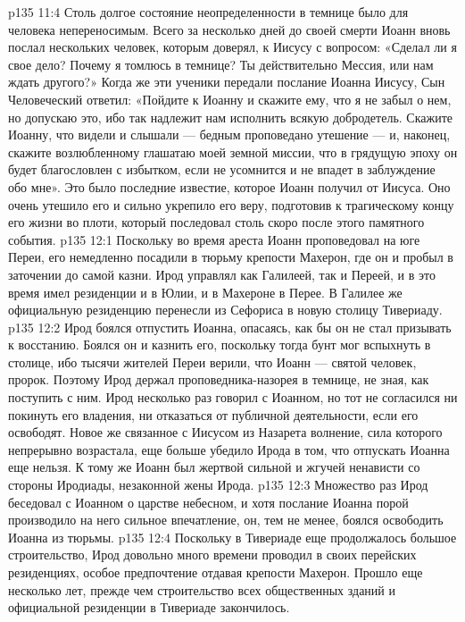 \vs p135 11:4 \pc Столь долгое состояние неопределенности в темнице было для человека непереносимым. Всего за несколько дней до своей смерти Иоанн вновь послал нескольких человек, которым доверял, к Иисусу с вопросом: «Сделал ли я свое дело? Почему я томлюсь в темнице? Ты действительно Мессия, или нам ждать другого?» Когда же эти ученики передали послание Иоанна Иисусу, Сын Человеческий ответил: «Пойдите к Иоанну и скажите ему, что я не забыл о нем, но допускаю это, ибо так надлежит нам исполнить всякую добродетель. Скажите Иоанну, что видели и слышали --- бедным проповедано утешение --- и, наконец, скажите возлюбленному глашатаю моей земной миссии, что в грядущую эпоху он будет благословлен с избытком, если не усомнится и не впадет в заблуждение обо мне». Это было последние известие, которое Иоанн получил от Иисуса. Оно очень утешило его и сильно укрепило его веру, подготовив к трагическому концу его жизни во плоти, который последовал столь скоро после этого памятного события.
\vs p135 12:1 Поскольку во время ареста Иоанн проповедовал на юге Переи, его немедленно посадили в тюрьму крепости Махерон, где он и пробыл в заточении до самой казни. Ирод управлял как Галилеей, так и Переей, и в это время имел резиденции и в Юлии, и в Махероне в Перее. В Галилее же официальную резиденцию перенесли из Сефориса в новую столицу Тивериаду.
\vs p135 12:2 Ирод боялся отпустить Иоанна, опасаясь, как бы он не стал призывать к восстанию. Боялся он и казнить его, поскольку тогда бунт мог вспыхнуть в столице, ибо тысячи жителей Переи верили, что Иоанн --- святой человек, пророк. Поэтому Ирод держал проповедника\hyp{}назорея в темнице, не зная, как поступить с ним. Ирод несколько раз говорил с Иоанном, но тот не согласился ни покинуть его владения, ни отказаться от публичной деятельности, если его освободят. Новое же связанное с Иисусом из Назарета волнение, сила которого непрерывно возрастала, еще больше убедило Ирода в том, что отпускать Иоанна еще нельзя. К тому же Иоанн был жертвой сильной и жгучей ненависти со стороны Иродиады, незаконной жены Ирода.
\vs p135 12:3 Множество раз Ирод беседовал с Иоанном о царстве небесном, и хотя послание Иоанна порой производило на него сильное впечатление, он, тем не менее, боялся освободить Иоанна из тюрьмы.
\vs p135 12:4 Поскольку в Тивериаде еще продолжалось большое строительство, Ирод довольно много времени проводил в своих перейских резиденциях, особое предпочтение отдавая крепости Махерон. Прошло еще несколько лет, прежде чем строительство всех общественных зданий и официальной резиденции в Тивериаде закончилось.
